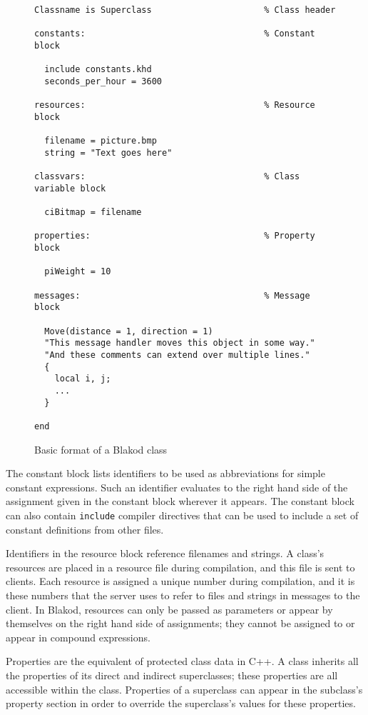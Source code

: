 \documentclass[12pt]{article}
\begin{document}
\begin{figure}

\begin{verbatim}
Classname is Superclass                      % Class header

constants:                                   % Constant block

  include constants.khd
  seconds_per_hour = 3600

resources:                                   % Resource block

  filename = picture.bmp
  string = "Text goes here"

classvars:                                   % Class variable block

  ciBitmap = filename

properties:                                  % Property block

  piWeight = 10

messages:                                    % Message block

  Move(distance = 1, direction = 1)
  "This message handler moves this object in some way."
  "And these comments can extend over multiple lines."
  {
    local i, j;
    ...
  }

end
\end{verbatim}

\caption{Basic format of a Blakod class}
\label{fig:class}

\end{figure}

The constant block lists identifiers to be used as abbreviations for
simple constant expressions.  Such an identifier evaluates to the
right hand side of the assignment given in the constant block wherever
it appears.  The constant block can also contain {\tt include}
compiler directives that can be used to include a set of constant
definitions from other files.

Identifiers in the resource block reference filenames and strings.  A
class's resources are placed in a resource file during compilation,
and this file is sent to clients.  Each resource is assigned a unique
number during compilation, and it is these numbers that the server
uses to refer to files and strings in messages to the client.  In
Blakod, resources can only be passed as parameters or appear by
themselves on the right hand side of assignments; they cannot be
assigned to or appear in compound expressions.

Properties are the equivalent of protected class data in C++.  A class
inherits all the properties of its direct and indirect superclasses;
these properties are all accessible within the class.  Properties of a
superclass can appear in the subclass's property section in order to
override the superclass's values for these properties.
\end{document}
